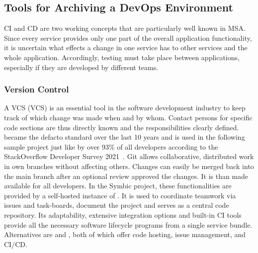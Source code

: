 \documentclass[12pt, a4paper]{article}
\begin{document}
    \subsection{Tools for Archiving a DevOps Environment}\label{ssec::getting_devops}
    \acl{CI} and \acl{CD} are two working concepts that are particularly well known in \ac{MSA}. Since every service provides only one part of the overall application functionality, it is uncertain what effects a change in one service has to other services and the whole application. Accordingly, testing must take place between applications, especially if they are developed by different teams.

        \subsubsection{Version Control}
        A \acl{VCS} (\ac{VCS}) is an essential tool in the software development industry to keep track of which change was made when and by whom. Contact persons for specific code sections are thus directly known and the responsibilities clearly defined.  became the defacto standard over the last 10 years and is used in the following sample project just like by over 93\% of all developers according to the StackOverflow Developer Survey 2021~\cite{stackoverflow2018}. Git allows collaborative, distributed work in own branches without affecting others. Changes can easily be merged back into the main branch after an optional review approved the changes. It is than made available for all developers. In the Symbic project, these functionalities are provided by a self-hosted instance of . It is used to coordinate teamwork via issues and task-boards, document the project and serves as a central code repository. Its adaptability, extensive integration options and built-in \acs{CI} tools provide all the necessary software lifecycle programs from a single service bundle. Alternatives are  and , both of which offer code hosting, issue management, and \ac{CI}/\ac{CD}.
\end{document}
